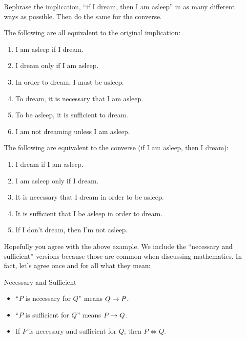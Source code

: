 \documentclass[12pt]{article}
\begin{document}
\begin{example}
 Rephrase the implication, ``if I dream, then I am asleep'' in as many different ways as possible.  Then do the same for the converse.

 \begin{solution}
  The following are all equivalent to the original implication:
  \begin{enumerate}
   \item I am asleep if I dream.
   \item I dream only if I am asleep.
   \item In order to dream, I must be asleep.
   \item To dream, it is necessary that I am asleep.
   \item To be asleep, it is sufficient to dream.
   \item I am not dreaming unless I am asleep.
  \end{enumerate}
The following are equivalent to the converse (if I am asleep, then I dream):
\begin{enumerate}
 \item I dream if I am asleep.
 \item I am asleep only if I dream.
 \item It is necessary that I dream in order to be asleep.
 \item It is sufficient that I be asleep in order to dream.
 \item If I don't dream, then I'm not asleep.
\end{enumerate}

 \end{solution}

\end{example}

Hopefully you agree with the above example.  We include the ``necessary and sufficient'' versions because those are common when discussing mathematics.  In fact, let's agree once and for all what they mean:


\begin{defbox}{Necessary and Sufficient}
\begin{itemize}
\item ``$P$ is necessary for $Q$'' means $Q \rightarrow P$.
 \item ``$P$ is sufficient for $Q$'' means $P \rightarrow Q$.
\item If $P$ is necessary and sufficient for $Q$, then $P \iff Q$.
\end{itemize}
\end{defbox}
\end{document}
